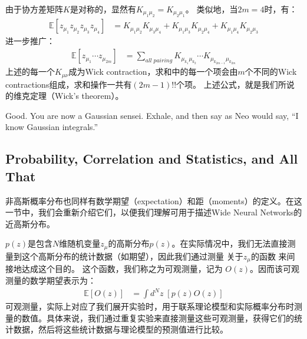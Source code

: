 由于协方差矩阵$K$是对称的，显然有$K_{\mu_1\mu_2}=K_{\mu_2\mu_1}$。
类似地，当$2m=4$时，有：
\begin{equation}
    \begin{split}
        \mathbb{E}[z_{\mu_1}z_{\mu_2}z_{\mu_3}z_{\mu_4}] 
        &= K_{\mu_1\mu_2}K_{\mu_3\mu_4} + 
        K_{\mu_1\mu_3}K_{\mu_2\mu_4} + 
        K_{\mu_1\mu_4}K_{\mu_2\mu_3}
    \end{split}
\end{equation}
进一步推广：
\begin{equation}
    \begin{split}
        \mathbb{E}[z_{\mu_1}\cdots z_{\mu_{2m}}] 
        &= \sum_{all\;pairing} {
            K_{\mu_{k_1}\mu_{k_2}}
            \cdots
            K_{\mu_{k_{2m-1}}\mu_{k_{2m}}}
        }
    \end{split}
\end{equation}
上述的每一个$K_{\mu\nu}$成为Wick contraction，求和中的每一个项会由$m$个不同的Wick contractions组成，求和操作一共有$(2m-1)!!$个项。
上述公式，就是我们所说的维克定理（Wick's theorem）。

Good. You are now a Gaussian sensei. Exhale, and then say as Neo would say, “I know Gaussian integrals.”



\subsection{Probability, Correlation and Statistics, and All That}

非高斯概率分布也同样有数学期望（expectation）和距（moments）的定义。在这一节中，我们会重新介绍它们，以便我们理解可用于描述Wide Neural Networks的近高斯分布。

$p(z)$是包含$N$维随机变量$z_\mu$的高斯分布$p(z)$。在实际情况中，我们无法直接测量到这个高斯分布的统计数据（如期望），因此我们通过测量 关于$z_\mu$的函数 来间接地达成这个目的。 这个函数，我们称之为可观测量，记为 $O(z)$。因而该可观测量的数学期望表示为：
\begin{equation}
    \begin{split}
        \label{eq:1.46}
        \mathbb{E}[O(z)] 
        &= \int d^N\!z\;[p(z)O(z)]
    \end{split}
\end{equation}
可观测量，实际上对应了我们展开实验时，用于联系理论模型和实际概率分布时测量的数值。具体来说，我们通过重复实验来直接测量这些可观测量，获得它们的统计数据，然后将这些统计数据与理论模型的预测值进行比较。

